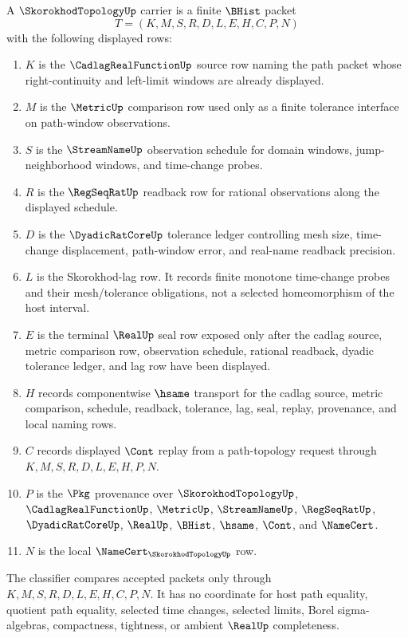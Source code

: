 \begin{definition}
\label{def:skorokhod-topology-carrier}
A $\SkorokhodTopologyUp$ carrier is a finite $\BHist$ packet
$$
T=(K,M,S,R,D,L,E,H,C,P,N)
$$
with the following displayed rows:
\begin{enumerate}
\item $K$ is the $\CadlagRealFunctionUp$ source row naming the path packet whose right-continuity and left-limit windows are already displayed.
\item $M$ is the $\MetricUp$ comparison row used only as a finite tolerance interface on path-window observations.
\item $S$ is the $\StreamNameUp$ observation schedule for domain windows, jump-neighborhood windows, and time-change probes.
\item $R$ is the $\RegSeqRatUp$ readback row for rational observations along the displayed schedule.
\item $D$ is the $\DyadicRatCoreUp$ tolerance ledger controlling mesh size, time-change displacement, path-window error, and real-name readback precision.
\item $L$ is the Skorokhod-lag row. It records finite monotone time-change probes and their mesh/tolerance obligations, not a selected homeomorphism of the host interval.
\item $E$ is the terminal $\RealUp$ seal row exposed only after the cadlag source, metric comparison row, observation schedule, rational readback, dyadic tolerance ledger, and lag row have been displayed.
\item $H$ records componentwise $\hsame$ transport for the cadlag source, metric comparison, schedule, readback, tolerance, lag, seal, replay, provenance, and local naming rows.
\item $C$ records displayed $\Cont$ replay from a path-topology request through $K,M,S,R,D,L,E,H,P,N$.
\item $P$ is the $\Pkg$ provenance over $\SkorokhodTopologyUp$, $\CadlagRealFunctionUp$, $\MetricUp$, $\StreamNameUp$, $\RegSeqRatUp$, $\DyadicRatCoreUp$, $\RealUp$, $\BHist$, $\hsame$, $\Cont$, and $\NameCert$.
\item $N$ is the local $\NameCert_{\SkorokhodTopologyUp}$ row.
\end{enumerate}
The classifier compares accepted packets only through $K,M,S,R,D,L,E,H,C,P,N$. It has no coordinate for host path equality, quotient path equality, selected time changes, selected limits, Borel sigma-algebras, compactness, tightness, or ambient $\RealUp$ completeness.
\end{definition}

